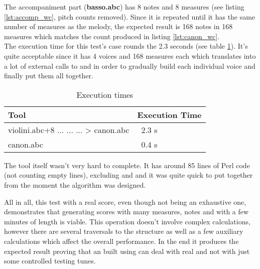 The accompaniment part (\textbf{basso.abc}) has 8 notes and 8 measures (see listing
\ref{lst:accomp_wc}, pitch counts removed). Since it is repeated until it has the same number of
measures as the melody, the expected result is 168 notes in 168 measures which matches the count
produced in listing \ref{lst:canon_wc}.\\



The execution time for this test's case rounds the 2.3 seconds (see table
\ref{tab:execution_times}). It's quite acceptable since it has 4 voices and 168 measures each which
translates into a lot of external calls to \catabc{} and \pasteabc{} in order to gradually build
each individual voice and finally put them all together.

\begin{center}
  \begin{table}[h]
    \begin{tabular}{|p{10cm}|p{4cm}|}
      \hline
      Tool & Execution Time\footnotemark[1]\\
      \hline
      \hline
      \canonabc{} violini.abc+8 ... ... ... > canon.abc & ~2.3 s
      \\
      \hline

      \hline
      \wcabc{} canon.abc & ~0.4 s
      \\
      \hline
    \end{tabular}
    \caption{Execution times}
    \label{tab:execution_times}
  \end{table}
\end{center}


The tool itself wasn't very hard to complete. It has around 85 lines of Perl code (not counting
empty lines), excluding \catabc{} and \pasteabc{} and it was quite quick to put together from the
moment the algorithm was designed.

All in all, this test with a real \abc{} score, even though not being an exhaustive one,
demonstrates that generating scores with many measures, notes and with a few minutes of length is
viable. This operation doesn't involve complex calculations, however there are several traversals to
the \abc{} structure as well as a few auxiliary calculations which affect the overall performance.
In the end it produces the expected result proving that an \abcpt{} built using \abcdt{} can deal
with real \abc{} and not with just some controlled testing tunes.
